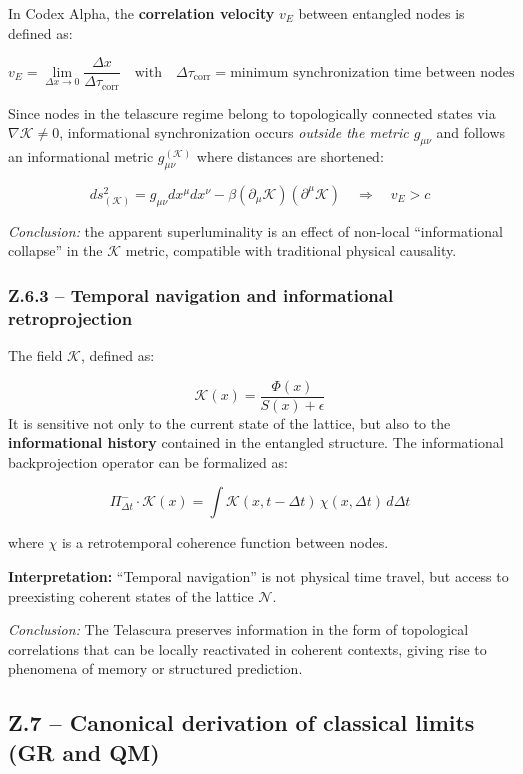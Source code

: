 \documentclass[12pt]{article}
\begin{document}
In Codex Alpha, the \textbf{correlation velocity} $v_E$ between entangled nodes is defined as:

\[
v_E = \lim_{\Delta x \to 0} \frac{\Delta x}{\Delta \tau_{\text{corr}}}
\quad \text{with} \quad \Delta \tau_{\text{corr}} = \text{minimum synchronization time between nodes}
\]

Since nodes in the telascure regime belong to topologically connected states via $\nabla \mathcal{K} \neq 0$, informational synchronization occurs \textit{outside the metric $g_{\mu\nu}$} and follows an informational metric $g^{(\mathcal{K})}_{\mu\nu}$ where distances are shortened:

\[
ds^2_{(\mathcal{K})} = g_{\mu\nu} dx^\mu dx^\nu - \beta \left( \partial_\mu \mathcal{K} \right) \left( \partial^\mu \mathcal{K} \right)
\quad \Rightarrow \quad v_E > c
\]

\textit{Conclusion:} the apparent superluminality is an effect of non-local “informational collapse” in the $\mathcal{K}$ metric, compatible with traditional physical causality.

\subsubsection*{Z.6.3 – Temporal navigation and informational retroprojection}

The field $\mathcal{K}$, defined as:

\[
\mathcal{K}(x) = \frac{\Phi(x)}{S(x) + \epsilon}
\]
It is sensitive not only to the current state of the lattice, but also to the \textbf{informational history} contained in the entangled structure. The informational backprojection operator can be formalized as:

\[
\Pi^-_{\Delta t} \cdot \mathcal{K}(x) = \int \mathcal{K}(x, t - \Delta t) \, \chi(x, \Delta t) \, d\Delta t
\]

where $\chi$ is a retrotemporal coherence function between nodes.

\textbf{Interpretation:} “Temporal navigation” is not physical time travel, but access to preexisting coherent states of the lattice $\mathcal{N}$.

\textit{Conclusion:} The Telascura preserves information in the form of topological correlations that can be locally reactivated in coherent contexts, giving rise to phenomena of memory or structured prediction.

\subsection*{Z.7 – Canonical derivation of classical limits (GR and QM)}
\end{document}
